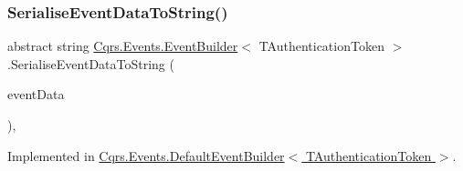 \subsubsection{\texorpdfstring{Serialise\+Event\+Data\+To\+String()}{SerialiseEventDataToString()}}
{\footnotesize\ttfamily abstract string \hyperlink{classCqrs_1_1Events_1_1EventBuilder}{Cqrs.\+Events.\+Event\+Builder}$<$ T\+Authentication\+Token $>$.Serialise\+Event\+Data\+To\+String (\begin{DoxyParamCaption}\item[{\hyperlink{interfaceCqrs_1_1Events_1_1IEvent}{I\+Event}$<$ T\+Authentication\+Token $>$}]{event\+Data }\end{DoxyParamCaption})\hspace{0.3cm}{\ttfamily [protected]}, {}}



Implemented in \hyperlink{classCqrs_1_1Events_1_1DefaultEventBuilder_afb73a13003a94135e5c97436e7e78e13_afb73a13003a94135e5c97436e7e78e13}{Cqrs.\+Events.\+Default\+Event\+Builder$<$ T\+Authentication\+Token $>$}.


